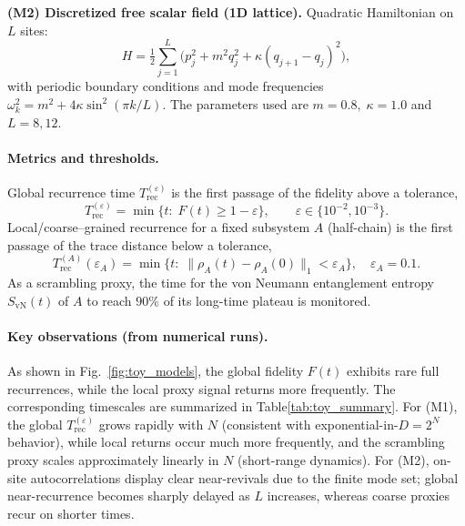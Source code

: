 \documentclass[12pt]{article}
\newcommand{\Trec}{T_{\text{rec}}}
\newcommand{\TrecA}{T^{(A)}_{\text{rec}}}
\theoremstyle{remark}
\begin{document}
\noindent
\textbf{(M2) Discretized free scalar field (1D lattice).}
Quadratic Hamiltonian on \(L\) sites:
\[
H=\tfrac12\sum_{j=1}^{L}\!\big(p_j^2+m^2 q_j^2+\kappa (q_{j+1}-q_j)^2\big),
\]
with periodic boundary conditions and mode frequencies
\(\omega_k^2=m^2+4\kappa\sin^2(\pi k/L)\).
The parameters used are \(m=0.8,\;\kappa=1.0\) and \(L=8,12\).

\paragraph{Metrics and thresholds.}
Global recurrence time \(\Trec^{(\varepsilon)}\) is the first passage of the fidelity above a tolerance,
\[
\Trec^{(\varepsilon)}=\min\{t:\; F(t)\ge 1-\varepsilon\},\qquad \varepsilon\in\{10^{-2},10^{-3}\}.
\]
Local/coarse–grained recurrence for a fixed subsystem \(A\) (half-chain) is the first passage of the trace distance below a tolerance,
\[
\TrecA(\varepsilon_A)=\min\{t:\;\|\rho_A(t)-\rho_A(0)\|_1<\varepsilon_A\},\quad \varepsilon_A=0.1.
\]
As a scrambling proxy, the time for the von Neumann entanglement entropy \(S_{\mathrm{vN}}(t)\) of \(A\) to reach \(90\%\) of its long-time plateau is monitored.

\paragraph{Key observations (from numerical runs).}
As shown in Fig.~\ref{fig:toy_models}, the global fidelity $F(t)$ exhibits rare full recurrences, while the local proxy signal returns more frequently. The corresponding timescales are summarized in Table\ref{tab:toy_summary}.
For (M1), the global \(\Trec^{(\varepsilon)}\) grows rapidly with \(N\) (consistent with exponential-in-\(D=2^N\) behavior),
while local returns occur much more frequently, and the scrambling proxy scales approximately linearly in \(N\) (short-range dynamics).
For (M2), on-site autocorrelations display clear near-revivals due to the finite mode set; global near-recurrence becomes sharply delayed as \(L\) increases, whereas coarse proxies recur on shorter times.
\end{document}
